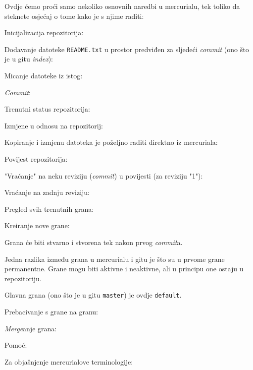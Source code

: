 Ovdje ćemo proći samo nekoliko osnovnih naredbi u mercurialu, tek toliko da steknete osjećaj o tome kako je s njime raditi:

Inicijalizacija repozitorija:


Dodavanje datoteke \verb+README.txt+ u prostor predviđen za sljedeći \emph{commit} (ono što je u gitu \emph{index}):


Micanje datoteke iz istog:


\emph{Commit}:


Trenutni status repozitorija:


Izmjene u odnosu na repozitorij:


Kopiranje i izmjenu datoteka je poželjno raditi direktno iz mercuriala:


Povijest repozitorija:


"Vraćanje" na neku reviziju (\emph{commit}) u povijesti (za reviziju "1"):


Vraćanje na zadnju reviziju:


Pregled svih trenutnih grana:


Kreiranje nove grane:


Grana će biti stvarno i stvorena tek nakon prvog \emph{commit}a.

Jedna razlika između grana u mercurialu i gitu je što su u prvome grane permanentne.
Grane mogu biti aktivne i neaktivne, ali u principu one ostaju u repozitoriju.

Glavna grana (ono što je u gitu \verb+master+) je ovdje \verb+default+.

Prebacivanje s grane na granu:


\emph{Merge}anje grana:


Pomoć:


Za objašnjenje mercurialove terminologije:


